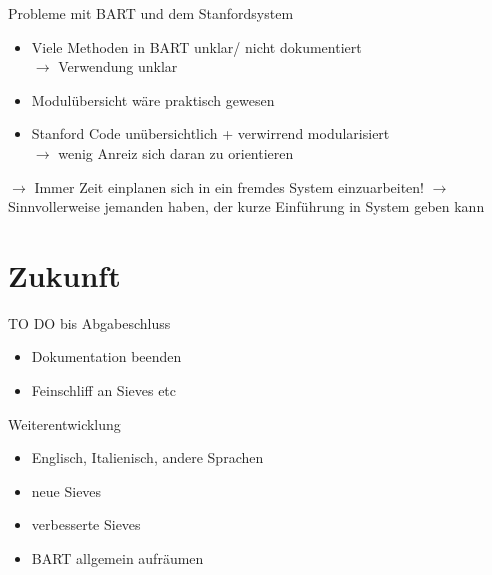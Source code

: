 \documentclass[11pt,a4paper]{beamer}
\begin{document}
\begin{frame}{Probleme mit BART und dem Stanfordsystem}
\begin{itemize}
\item Viele Methoden in BART unklar/ nicht dokumentiert \\$\rightarrow$  Verwendung unklar
\item Modulübersicht wäre praktisch gewesen
\item Stanford Code unübersichtlich + verwirrend modularisiert\\$\rightarrow$ wenig Anreiz sich daran zu orientieren
\end{itemize}
$\rightarrow$ Immer Zeit einplanen sich in ein fremdes System einzuarbeiten!
$\rightarrow$ Sinnvollerweise jemanden haben, der kurze Einführung in System geben kann
\end{frame}



\section{Zukunft}
\begin{frame}{TO DO bis Abgabeschluss}
\begin{itemize}
\item Dokumentation beenden
\item Feinschliff an Sieves etc
\end{itemize}
\end{frame}

\begin{frame}{Weiterentwicklung}
\begin{itemize}
\item Englisch, Italienisch, andere Sprachen
\item neue Sieves 
\item verbesserte Sieves
\item BART allgemein aufräumen
\end{itemize}
\end{frame}


%
%
\end{document}
